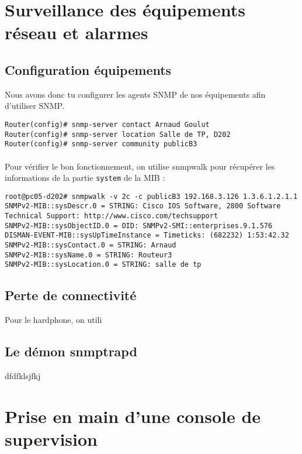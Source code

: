 \documentclass[12pt,a4paper,notitlepage]{article}
\begin{document}
\section{Surveillance des équipements réseau et alarmes}
\subsection{Configuration équipements}
Nous avons donc tu configurer les agents SNMP de nos équipements afin d'utiliser SNMP.\\
\begin{lstlisting}[title=Commandes Cisco pour configurer l'agent SNMP du routeur]
Router(config)# snmp-server contact Arnaud Goulut
Router(config)# snmp-server location Salle de TP, D202
Router(config)# snmp-server community publicB3
\end{lstlisting}

\paragraph{} Pour vérifier le bon fonctionnement, on utilise snmpwalk pour récupérer les informations de la partie \texttt{system} de la MIB :

\begin{lstlisting}[title=Vérification du fonctionnement SNMP sur le routeur]
root@pc05-d202# snmpwalk -v 2c -c publicB3 192.168.3.126 1.3.6.1.2.1.1
SNMPv2-MIB::sysDescr.0 = STRING: Cisco IOS Software, 2800 Software
Technical Support: http://www.cisco.com/techsupport
SNMPv2-MIB::sysObjectID.0 = OID: SNMPv2-SMI::enterprises.9.1.576
DISMAN-EVENT-MIB::sysUpTimeInstance = Timeticks: (682232) 1:53:42.32
SNMPv2-MIB::sysContact.0 = STRING: Arnaud
SNMPv2-MIB::sysName.0 = STRING: Routeur3
SNMPv2-MIB::sysLocation.0 = STRING: salle de tp
\end{lstlisting}

\subsection{Perte de connectivité}
Pour le hardphone, on utili

\subsection{Le démon snmptrapd}
dfdfklsjfkj

\section{Prise en main d'une console de supervision}
\end{document}
